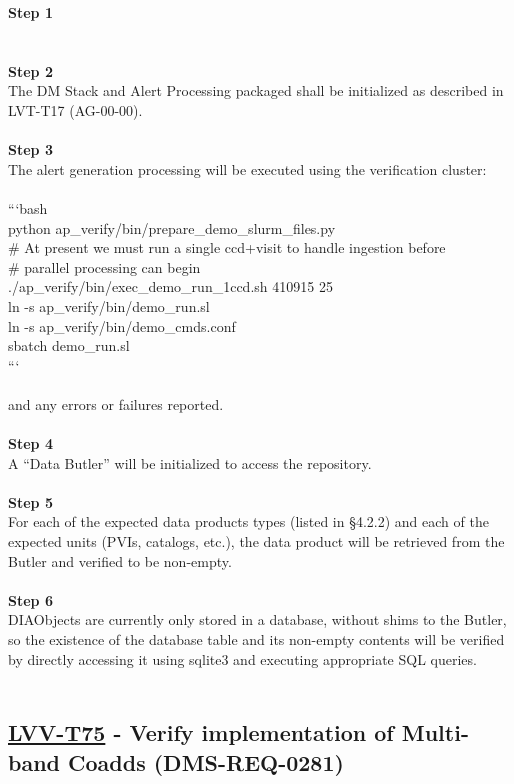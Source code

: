 \textbf{Step 1}\\
~\\
~\\
\textbf{Step 2}\\
The DM Stack and Alert Processing packaged shall be initialized as
described in LVT-T17 (AG-00-00).\\
~\\
\textbf{Step 3}\\
The alert generation processing will be executed using the verification
cluster:\\
~\\
```bash\\
python ap\_verify/bin/prepare\_demo\_slurm\_files.py\\
\# At present we must run a single ccd+visit to handle ingestion
before\\
\# parallel processing can begin\\
./ap\_verify/bin/exec\_demo\_run\_1ccd.sh 410915 25\\
ln -s ap\_verify/bin/demo\_run.sl\\
ln -s ap\_verify/bin/demo\_cmds.conf\\
sbatch demo\_run.sl\\
```\\
~\\
and any errors or failures reported.\\
~\\
\textbf{Step 4}\\
A ``Data Butler'' will be initialized to access the repository.\\
~\\
\textbf{Step 5}\\
For each of the expected data products types (listed in §4.2.2) and each
of the expected units (PVIs, catalogs, etc.), the data product will be
retrieved from the Butler and verified to be non-empty.\\
~\\
\textbf{Step 6}\\
DIAObjects are currently only stored in a database, without shims to the
Butler, so the existence of the database table and its non-empty
contents will be verified by directly accessing it using sqlite3 and
executing appropriate SQL queries.\\
~\\

\hypertarget{lvv-t75---verify-implementation-of-multi-band-coadds-dms-req-0281}{%
\subsection{\texorpdfstring{\href{https://jira.lsstcorp.org/secure/Tests.jspa\#/testCase/LVV-T75}{LVV-T75}
- Verify implementation of Multi-band Coadds
(DMS-REQ-0281)}{LVV-T75 - Verify implementation of Multi-band Coadds (DMS-REQ-0281)}}\label{lvv-t75---verify-implementation-of-multi-band-coadds-dms-req-0281}}

